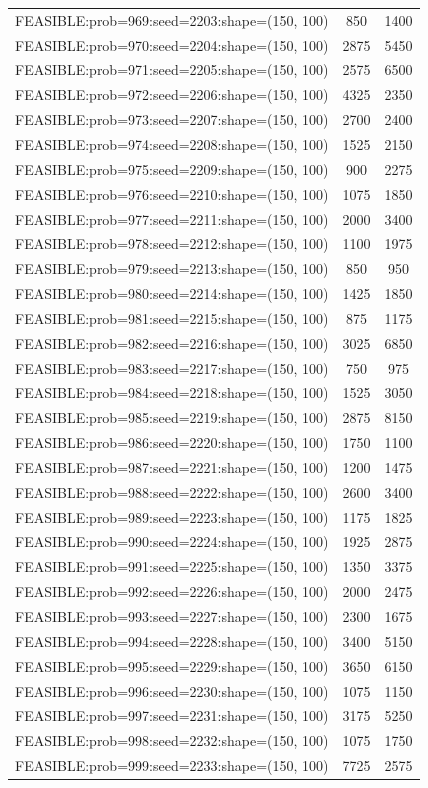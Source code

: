 \begin{longtable}{lcc}
FEASIBLE:prob=969:seed=2203:shape=(150, 100) &      850 &  1400 \\
FEASIBLE:prob=970:seed=2204:shape=(150, 100) &     2875 &  5450 \\
FEASIBLE:prob=971:seed=2205:shape=(150, 100) &     2575 &  6500 \\
FEASIBLE:prob=972:seed=2206:shape=(150, 100) &     4325 &  2350 \\
FEASIBLE:prob=973:seed=2207:shape=(150, 100) &     2700 &  2400 \\
FEASIBLE:prob=974:seed=2208:shape=(150, 100) &     1525 &  2150 \\
FEASIBLE:prob=975:seed=2209:shape=(150, 100) &      900 &  2275 \\
FEASIBLE:prob=976:seed=2210:shape=(150, 100) &     1075 &  1850 \\
FEASIBLE:prob=977:seed=2211:shape=(150, 100) &     2000 &  3400 \\
FEASIBLE:prob=978:seed=2212:shape=(150, 100) &     1100 &  1975 \\
FEASIBLE:prob=979:seed=2213:shape=(150, 100) &      850 &   950 \\
FEASIBLE:prob=980:seed=2214:shape=(150, 100) &     1425 &  1850 \\
FEASIBLE:prob=981:seed=2215:shape=(150, 100) &      875 &  1175 \\
FEASIBLE:prob=982:seed=2216:shape=(150, 100) &     3025 &  6850 \\
FEASIBLE:prob=983:seed=2217:shape=(150, 100) &      750 &   975 \\
FEASIBLE:prob=984:seed=2218:shape=(150, 100) &     1525 &  3050 \\
FEASIBLE:prob=985:seed=2219:shape=(150, 100) &     2875 &  8150 \\
FEASIBLE:prob=986:seed=2220:shape=(150, 100) &     1750 &  1100 \\
FEASIBLE:prob=987:seed=2221:shape=(150, 100) &     1200 &  1475 \\
FEASIBLE:prob=988:seed=2222:shape=(150, 100) &     2600 &  3400 \\
FEASIBLE:prob=989:seed=2223:shape=(150, 100) &     1175 &  1825 \\
FEASIBLE:prob=990:seed=2224:shape=(150, 100) &     1925 &  2875 \\
FEASIBLE:prob=991:seed=2225:shape=(150, 100) &     1350 &  3375 \\
FEASIBLE:prob=992:seed=2226:shape=(150, 100) &     2000 &  2475 \\
FEASIBLE:prob=993:seed=2227:shape=(150, 100) &     2300 &  1675 \\
FEASIBLE:prob=994:seed=2228:shape=(150, 100) &     3400 &  5150 \\
FEASIBLE:prob=995:seed=2229:shape=(150, 100) &     3650 &  6150 \\
FEASIBLE:prob=996:seed=2230:shape=(150, 100) &     1075 &  1150 \\
FEASIBLE:prob=997:seed=2231:shape=(150, 100) &     3175 &  5250 \\
FEASIBLE:prob=998:seed=2232:shape=(150, 100) &     1075 &  1750 \\
FEASIBLE:prob=999:seed=2233:shape=(150, 100) &     7725 &  2575 \\
\end{longtable}
